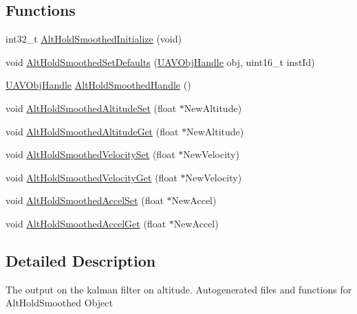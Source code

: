 \subsection*{\-Functions}
\begin{DoxyCompactItemize}
\item 
int32\-\_\-t \hyperlink{group___alt_hold_smoothed_ga0d0628fc3d4883b9c2a7c3d7f785c366}{\-Alt\-Hold\-Smoothed\-Initialize} (void)
\item 
void \hyperlink{group___alt_hold_smoothed_gaf8cec35674f28a427a392476150495e2}{\-Alt\-Hold\-Smoothed\-Set\-Defaults} (\hyperlink{targets_2_u_a_v_objects_2inc_2uavobjectmanager_8h_a279053e22be53ce9f895043aaeb91e3b}{\-U\-A\-V\-Obj\-Handle} obj, uint16\-\_\-t inst\-Id)
\item 
\hyperlink{targets_2_u_a_v_objects_2inc_2uavobjectmanager_8h_a279053e22be53ce9f895043aaeb91e3b}{\-U\-A\-V\-Obj\-Handle} \hyperlink{group___alt_hold_smoothed_gacf4912bf4ea7692caae986a1f4b507b7}{\-Alt\-Hold\-Smoothed\-Handle} ()
\item 
void \hyperlink{group___alt_hold_smoothed_ga8d34362db9c14d071177ab25637c3ecd}{\-Alt\-Hold\-Smoothed\-Altitude\-Set} (float $\ast$\-New\-Altitude)
\item 
void \hyperlink{group___alt_hold_smoothed_ga1ca870770fce4363992ca84499ef66ef}{\-Alt\-Hold\-Smoothed\-Altitude\-Get} (float $\ast$\-New\-Altitude)
\item 
void \hyperlink{group___alt_hold_smoothed_ga2ce30cb68ab6d0a3fff2f62efefa41b6}{\-Alt\-Hold\-Smoothed\-Velocity\-Set} (float $\ast$\-New\-Velocity)
\item 
void \hyperlink{group___alt_hold_smoothed_ga16f379d8a2d73fb92c45317badf48d3b}{\-Alt\-Hold\-Smoothed\-Velocity\-Get} (float $\ast$\-New\-Velocity)
\item 
void \hyperlink{group___alt_hold_smoothed_ga7019ad84a5627ab98b86177f50a8e642}{\-Alt\-Hold\-Smoothed\-Accel\-Set} (float $\ast$\-New\-Accel)
\item 
void \hyperlink{group___alt_hold_smoothed_gada8ee4c33187968ceee18f84b4c68d8a}{\-Alt\-Hold\-Smoothed\-Accel\-Get} (float $\ast$\-New\-Accel)
\end{DoxyCompactItemize}


\subsection{\-Detailed \-Description}
\-The output on the kalman filter on altitude. \-Autogenerated files and functions for \-Alt\-Hold\-Smoothed \-Object 

